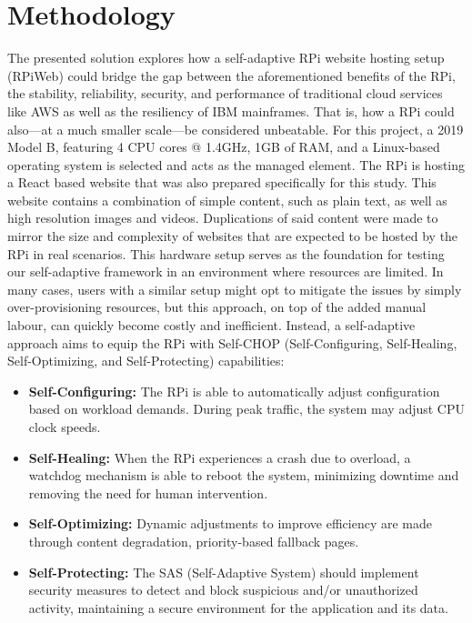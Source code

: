 \documentclass[conference]{IEEEtran}
\begin{document}
\section{\textbf{Methodology}}\label{methodology}
The presented solution explores how a self-adaptive RPi website hosting setup (RPiWeb) could bridge the gap between the aforementioned benefits of the RPi, the stability, reliability, security, and performance of traditional cloud services like AWS as well as the resiliency of IBM mainframes. That is, how a RPi could also—at a much smaller scale—be considered unbeatable. For this project, a 2019 Model B, featuring 4 CPU cores @ 1.4GHz, 1GB of RAM, and a Linux-based operating system is selected and acts as the managed element. The RPi is hosting a React based website that was also prepared specifically for this study. This website contains a combination of simple content, such as plain text, as well as high resolution images and videos. Duplications of said content were made to mirror the size and complexity of websites that are expected to be hosted by the RPi in real scenarios. This hardware setup serves as the foundation for testing our self-adaptive framework in an environment where resources are limited. In many cases, users with a similar setup might opt to mitigate the issues by simply over-provisioning resources, but this approach, on top of the added manual labour, can quickly become costly and inefficient. Instead, a self-adaptive approach aims to equip the RPi with Self-CHOP (Self-Configuring, Self-Healing, Self-Optimizing, and Self-Protecting) capabilities:

\begin{itemize}
    \item \textbf{Self-Configuring:}
          The RPi is able to automatically adjust configuration based on workload demands. During peak traffic, the system may adjust CPU clock speeds.
    \item \textbf{Self-Healing:}
          When the RPi experiences a crash due to overload, a watchdog mechanism is able to reboot the system, minimizing downtime and removing the need for human intervention.
    \item \textbf{Self-Optimizing:}
          Dynamic adjustments to improve efficiency are made through content degradation, priority-based fallback pages.
    \item \textbf{Self-Protecting:}
          The SAS (Self-Adaptive System) should implement security measures to detect and block suspicious and/or unauthorized activity, maintaining a secure environment for the application and its data.
\end{itemize}
\end{document}
